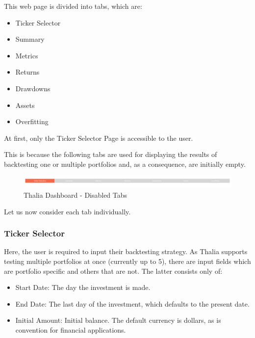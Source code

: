 \documentclass[main.tex]{subfiles}
\begin{document}
This web page is divided into tabs, which are:

\begin{itemize}
    \item Ticker Selector
    \item Summary
    \item Metrics
    \item Returns 
    \item Drawdowns
    \item Assets
    \item Overfitting
\end{itemize}

At first, only the Ticker Selector Page is accessible to the user. 

This is because the following tabs are used for displaying the results of backtesting one or multiple portfolios and, as a consequence, are initially empty.

\begin{figure}[H]
   \centering
   \includegraphics[width=\textwidth]{08Appendices/081User/081Pictures/disabled_tabs.png}
   \caption{Thalia Dashboard - Disabled Tabs}
   \label{thalia_disabled_tabs}
\end{figure}

Let us now consider each tab individually. 

\subsubsection{Ticker Selector}

\label{create_portfolio}

Here, the user is required to input their backtesting strategy. As Thalia supports testing multiple portfolios at once (currently up to 5), there are input fields which are portfolio specific and others that are not. The latter consists only of:

\begin{itemize}
    \item Start Date: The day the investment is made.
    \item End Date: The last day of the investment, which defaults to the present date.
    \item Initial Amount: Initial balance. The default currency is dollars, as is convention for financial applications.
\end{itemize}
\end{document}
